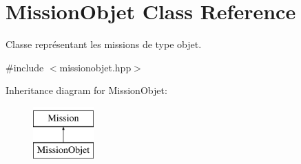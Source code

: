 \hypertarget{class_mission_objet}{\section{Mission\-Objet Class Reference}
\label{class_mission_objet}
}


Classe représentant les missions de type objet.  




{\ttfamily \#include $<$missionobjet.\-hpp$>$}

Inheritance diagram for Mission\-Objet\-:\begin{figure}[H]
\begin{center}
\leavevmode
\includegraphics[height=2.000000cm]{class_mission_objet}
\end{center}
\end{figure}
